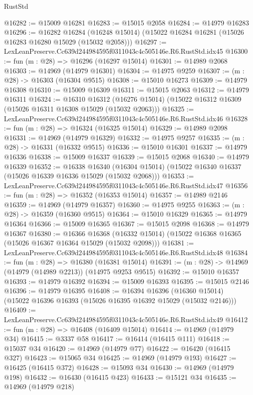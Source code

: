 \begin{lexlean}{RustStd}
\begin{coremodule}
@16282 := @15009 @16281
@16283 := @15015 @2058
@16284 := @14979 @16283
@16296 := @16282
    @16284
    (@16248 @15014)
    (@15022 @16284 @16281 (@15026 @16283 @16280 @15029 (@15032 @2058)))
@16297 := LexLeanPreserve.Cc639d244984595f0311043c4c505146e.R6.RustStd.idx45
@16300 := fun (m : @28) => @16296 (@16297 @15014)
@16301 := @14989 @2068
@16303 := @14969 (@14979 @16301)
@16304 := @14975 @9259
@16307 := (m : @28) -> @16303 (@16304 @9515)
@16308 := @15010 @16273
@16309 := @14979 @16308
@16310 := @15009 @16309
@16311 := @15015 @2063
@16312 := @14979 @16311
@16324 := @16310
    @16312
    (@16276 @15014)
    (@15022 @16312 @16309 (@15026 @16311 @16308 @15029 (@15032 @2063)))
@16325 := LexLeanPreserve.Cc639d244984595f0311043c4c505146e.R6.RustStd.idx46
@16328 := fun (m : @28) => @16324 (@16325 @15014)
@16329 := @14989 @2098
@16331 := @14969 (@14979 @16329)
@16332 := @14975 @9257
@16335 := (m : @28) -> @16331 (@16332 @9515)
@16336 := @15010 @16301
@16337 := @14979 @16336
@16338 := @15009 @16337
@16339 := @15015 @2068
@16340 := @14979 @16339
@16352 := @16338
    @16340
    (@16304 @15014)
    (@15022 @16340 @16337 (@15026 @16339 @16336 @15029 (@15032 @2068)))
@16353 := LexLeanPreserve.Cc639d244984595f0311043c4c505146e.R6.RustStd.idx47
@16356 := fun (m : @28) => @16352 (@16353 @15014)
@16357 := @14989 @2146
@16359 := @14969 (@14979 @16357)
@16360 := @14975 @9255
@16363 := (m : @28) -> @16359 (@16360 @9515)
@16364 := @15010 @16329
@16365 := @14979 @16364
@16366 := @15009 @16365
@16367 := @15015 @2098
@16368 := @14979 @16367
@16380 := @16366
    @16368
    (@16332 @15014)
    (@15022 @16368 @16365 (@15026 @16367 @16364 @15029 (@15032 @2098)))
@16381 := LexLeanPreserve.Cc639d244984595f0311043c4c505146e.R6.RustStd.idx48
@16384 := fun (m : @28) => @16380 (@16381 @15014)
@16391 := (m : @28) -> @14969 (@14979 (@14989 @2213)) (@14975 @9253 @9515)
@16392 := @15010 @16357
@16393 := @14979 @16392
@16394 := @15009 @16393
@16395 := @15015 @2146
@16396 := @14979 @16395
@16408 := @16394
    @16396
    (@16360 @15014)
    (@15022 @16396 @16393 (@15026 @16395 @16392 @15029 (@15032 @2146)))
@16409 := LexLeanPreserve.Cc639d244984595f0311043c4c505146e.R6.RustStd.idx49
@16412 := fun (m : @28) => @16408 (@16409 @15014)
@16414 := @14969 (@14979 @34)
@16415 := @3337 @58
@16417 := @16414 (@16415 @111)
@16418 := @15037 @34
@16420 := @14969 (@14979 @77)
@16422 := @16420 (@16415 @327)
@16423 := @15065 @34
@16425 := @14969 (@14979 @193)
@16427 := @16425 (@16415 @372)
@16428 := @15093 @34
@16430 := @14969 (@14979 @198)
@16432 := @16430 (@16415 @423)
@16433 := @15121 @34
@16435 := @14969 (@14979 @218)

\end{coremodule}
\end{lexlean}
